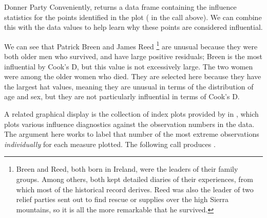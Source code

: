 \documentclass[11pt]{book}
\renewenvironment{knitrout}{\small\renewcommand{\baselinestretch}{.85}}{} %
\begin{document}
\begin{Example}[donner2]{Donner Party}
Conveniently,  returns a data frame containing the influence statistics for the
points identified in the plot ( in the call above).  We can combine this with the
data values to help learn why these points are considered influential.
\begin{knitrout}
\color{fgcolor}
\end{knitrout}
We can see that Patrick Breen and James Reed%
\footnote{
Breen and Reed, both born in Ireland, were the leaders of their family groups.
Among others, both kept detailed diaries of their experiences, from which most
of the historical record derives.  Reed was also the leader of two relief parties
sent out to find rescue or supplies over the high Sierra mountains, so it is all the
more remarkable that he survived.
}
are unusual because they were
both older men who survived, and have large positive residuals; Breen is the most influential
by Cook's D, but this value is not excessively large. The two women were among the older
women who died.  They are selected here because they have the largest hat values,
meaning they are unusual in terms of the distribution of age and sex, but they are not
particularly influential in terms of Cook's D.

A related graphical display is the collection of index plots provided by
 in , which plots various influence diagnostics
against the observation numbers in the data.  The  argument here
works to label that number of the most extreme observations \emph{individually} for
each measure plotted.  The following call produces .
\begin{knitrout}
\color{fgcolor}\begin{kframe}
\begin{alltt}
 \hlstd{=}\hlstd{(}\hlstd{,} \hlstd{,} \hlstd{),}
                   \hlstd{=}\hlstd{)}
\end{alltt}
\end{kframe}\begin{figure}[!htbp]



\end{figure}
\end{knitrout}
\end{Example}
\end{document}

